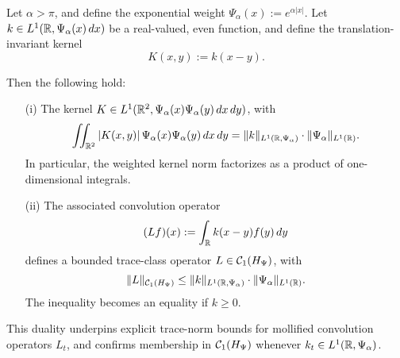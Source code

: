 \begin{lemma}
\label{lem:weighted_trace_norm_duality}
Let \( \alpha > \pi \), and define the exponential weight \( \Psi_\alpha(x) := e^{\alpha |x|} \). Let \( k \in L^1(\mathbb{R}, \Psi_\alpha(x)\, dx) \) be a real-valued, even function, and define the translation-invariant kernel
\[
K(x,y) := k(x - y).
\]

Then the following hold:
\begin{enumerate}
    \item[\textup{(i)}] The kernel \( K \in L^1(\mathbb{R}^2, \Psi_\alpha(x)\Psi_\alpha(y)\, dx\,dy) \), with
    \[
    \iint_{\mathbb{R}^2} |K(x,y)|\, \Psi_\alpha(x)\Psi_\alpha(y)\, dx\,dy
    = \|k\|_{L^1(\mathbb{R}, \Psi_\alpha)} \cdot \|\Psi_\alpha\|_{L^1(\mathbb{R})}.
    \]
    In particular, the weighted kernel norm factorizes as a product of one-dimensional integrals.

    \item[\textup{(ii)}] The associated convolution operator
    \[
    (L f)(x) := \int_{\mathbb{R}} k(x - y) f(y)\, dy
    \]
    defines a bounded trace-class operator \( L \in \mathcal{C}_1(H_{\Psi}) \), with
    \[
    \| L \|_{\mathcal{C}_1(H_{\Psi})}
    \le \|k\|_{L^1(\mathbb{R}, \Psi_\alpha)} \cdot \|\Psi_\alpha\|_{L^1(\mathbb{R})}.
    \]
    The inequality becomes an equality if \( k \ge 0 \).
\end{enumerate}

\medskip
\noindent
This duality underpins explicit trace-norm bounds for mollified convolution operators \( L_t \), and confirms membership in \( \mathcal{C}_1(H_{\Psi}) \) whenever \( k_t \in L^1(\mathbb{R}, \Psi_\alpha) \).
\end{lemma}
